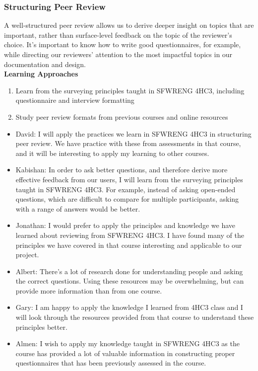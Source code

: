 \documentclass[12pt, titlepage]{article}
\begin{document}
\subsubsection{Structuring Peer Review}
A well-structured peer review allows us to derive deeper insight on topics that
are important, rather than surface-level feedback on the topic of the reviewer's
choice. It's important to know how to write good questionnaires, for example,
while directing our reviewers' attention to the most impactful topics in our
documentation and design. \\

\noindent \textbf{Learning Approaches}
\begin{enumerate}
    \item Learn from the surveying principles taught in SFWRENG 4HC3, including
    questionnaire and interview formatting
    \item Study peer review formats from previous courses and online resources
\end{enumerate}

\begin{itemize}
    \item David: I will apply the practices we learn in SFWRENG 4HC3 in
    structuring peer review. We have practice with these from assessments in
    that course, and it will be interesting to apply my learning to other
    courses.
    \item Kabishan: In order to ask better questions, and therefore derive more
    effective feedback from our users, I will learn from the surveying
    principles taught in SFWRENG 4HC3. For example, instead of asking open-ended
    questions, which are difficult to compare for multiple participants, asking
    with a range of answers would be better.
    \item Jonathan: I would prefer to apply the principles and knowledge we have
    learned about reviewing from SFWRENG 4HC3. I have found many of the
    principles we have covered in that course interesting and applicable to our
    project.
    \item Albert: There's a lot of research done for understanding people and
    asking the correct questions. Using these resources may be overwhelming, but
    can provide more information than from one course.
    \item Gary: I am happy to apply the knowledge I learned from 4HC3 class and
    I will look through the resources provided from that course to understand
    these principles better.
    \item Almen: I wish to apply my knowledge taught in SFWRENG 4HC3 as the
    course has provided a lot of valuable information in constructing proper
    questionnaires that has been previously assessed in the course.
\end{itemize}
\end{document}
